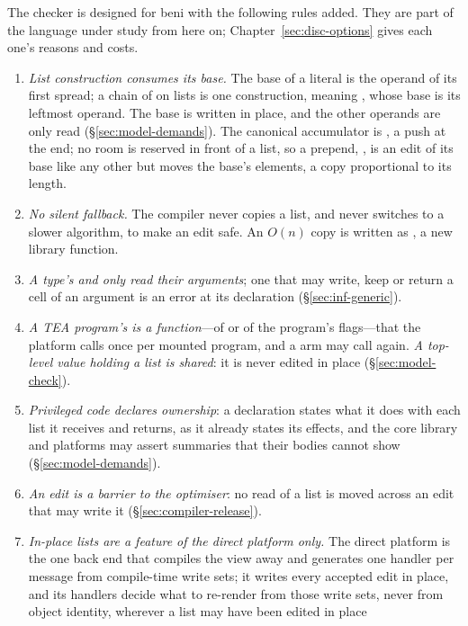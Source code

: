 The checker is designed for beni with the following rules added. They are part of the language under
study from here on; Chapter~\ref{sec:disc-options} gives each one's reasons and costs.
\begin{enumerate}
\item \emph{List construction consumes its base.} The base of a literal is the operand of its first
spread; a chain of \code{++} on lists is one construction,  meaning
\code{[ …a, …b, …c ]}, whose base is its leftmost operand. The base is written in place, and the other
operands are only read (\S\ref{sec:model-demands}). The canonical accumulator is \code{[ …acc, x ]}, a
push at the end; no room is reserved in front of a list, so a prepend, \code{[ x, …acc ]}, is an edit of
its base like any other but moves the base's elements, a copy proportional to its length.
\item \emph{No silent fallback.} The compiler never copies a list, and never switches to a slower
algorithm, to make an edit safe. An $O(n)$ copy is written as , a new library function.
\item \emph{A type's  and  only read their arguments}; one that may write, keep or
return a cell of an argument is an error at its declaration (\S\ref{sec:inf-generic}).
\item \emph{A TEA program's  is a function}---of  or of the program's flags---that the
platform calls once per mounted program, and a  arm may call again. \emph{A top-level value
holding a list is shared}: it is never edited in place (\S\ref{sec:model-check}).
\item \emph{Privileged code declares ownership}: a  declaration states what it does with
each list it receives and returns, as it already states its effects, and the core library and platforms
may assert summaries that their bodies cannot show (\S\ref{sec:model-demands}).
\item \emph{An edit is a barrier to the optimiser}: no read of a list is moved across an edit that may
write it (\S\ref{sec:compiler-release}).
\item \emph{In-place lists are a feature of the direct platform only.} The direct platform is the one
back end that compiles the view away and generates one handler per message from compile-time write
sets; it writes every accepted edit in place, and its handlers decide what to re-render from those
write sets, never from object identity, wherever a list may have been edited in place

\end{enumerate}
